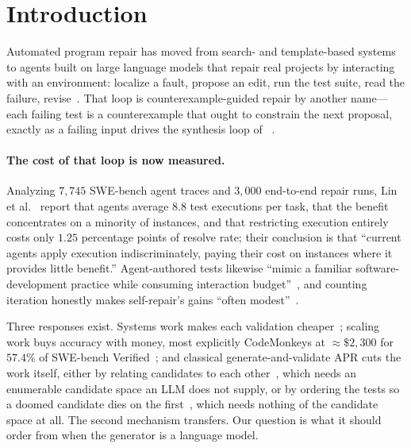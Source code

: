 \section{Introduction}
\label{sec:intro}

Automated program repair has moved from search- and template-based systems to
agents built on large language models that repair real projects by interacting
with an environment: localize a fault, propose an edit, run the test suite,
read the failure, revise~\cite{bouzenia2025repairagent,zhang2024autocoderover,%
yang2024sweagent,xia2025agentless,xia2024chatrepair}. That loop is
counterexample-guided repair by another name---each failing test is a
counterexample that ought to constrain the next proposal, exactly as a failing
input drives the synthesis loop of
\Sketch~\cite{solarlezama2006sketching}.

\paragraph{The cost of that loop is now measured.}
Analyzing $7{,}745$ SWE-bench agent traces and $3{,}000$ end-to-end repair
runs, Lin et al.~\cite{lin2026run} report that agents average $8.8$ test
executions per task, that the benefit concentrates on a minority of instances,
and that restricting execution entirely costs only $1.25$ percentage points of
resolve rate; their conclusion is that ``current agents apply execution
indiscriminately, paying their cost on instances where it provides little
benefit.'' Agent-authored tests likewise ``mimic a familiar
software-development practice while consuming interaction
budget''~\cite{chen2026rethinking}, and counting iteration honestly makes
self-repair's gains ``often modest''~\cite{olausson2024selfrepair}.

Three responses exist. Systems work makes each validation
cheaper~\cite{chen2021uniapr,xiao2024expressapr}; scaling work buys accuracy
with money, most explicitly CodeMonkeys at ${\approx}\$2{,}300$ for $57.4\%$ of
SWE-bench Verified~\cite{ehrlich2025codemonkeys}; and classical
generate-and-validate APR cuts the work itself, either by relating candidates
to each other~\cite{weimer2013leveraging,mechtaev2018testequivalence}, which
needs an enumerable candidate space an LLM does not supply, or by ordering the
tests so a doomed candidate dies on the
first~\cite{qi2013efficient,venugopal2020modification,lou2024when}, which needs
nothing of the candidate space at all. The second mechanism transfers. Our
question is what it should order from when the generator is a language model.

